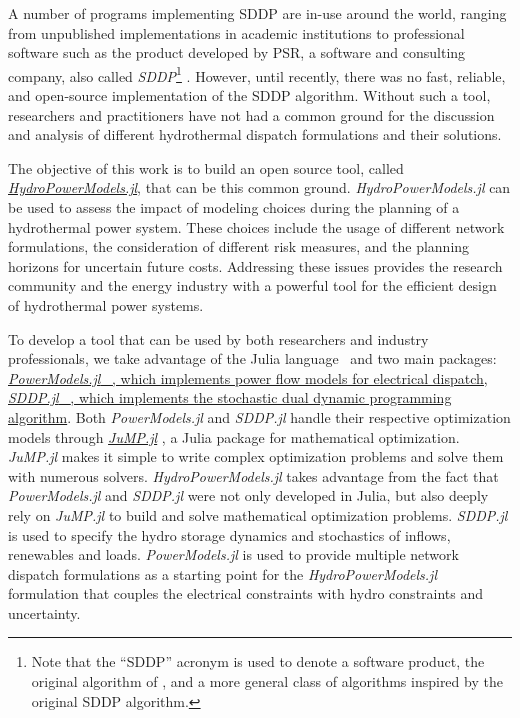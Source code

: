 \documentclass{juliacon}
\begin{document}
A number of programs implementing SDDP are in-use around the world, ranging from unpublished implementations in academic institutions to professional software such as the product developed by PSR, a software and consulting company, also called \textit{SDDP}\footnote{Note that the ``SDDP'' acronym is used to denote a software product, the original algorithm of \cite{pereira1991multi}, and a more general class of algorithms inspired by the original SDDP algorithm.} \cite{psr_software_2019}. However, until recently, there was no fast, reliable, and open-source implementation of the SDDP algorithm. Without such a tool, researchers and practitioners have not had a common ground for the discussion and analysis of different hydrothermal dispatch formulations and their solutions.

The objective of this work is to build an open source tool, called \href{https://github.com/andrewrosemberg/HydroPowerModels.jl}{\textit{HydroPowerModels.jl}}, that can be this common ground. \textit{HydroPowerModels.jl} can be used to assess the impact of modeling choices during the planning of a hydrothermal power system. These choices include the usage of different network formulations, the consideration of different risk measures, and the planning horizons for uncertain future costs. Addressing these issues provides the research community and the energy industry with a powerful tool for the efficient design of hydrothermal power systems.

To develop a tool that can be used by both researchers and industry professionals, we take advantage of the Julia language~\cite{bezanson2017julia} and two main packages: \href{https://github.com/lanl-ansi/PowerModels.jl}{\textit{PowerModels.jl} ~\cite{8442948}, which implements power flow models for electrical dispatch, \href{https://github.com/odow/SDDP.jl}{\textit{SDDP.jl}} ~\cite{dowson_sddp.jl}, which implements the stochastic dual dynamic programming algorithm}. Both \textit{PowerModels.jl} and \textit{SDDP.jl} handle their respective optimization models through \href{https://github.com/JuliaOpt/JuMP.jl}{\textit{JuMP.jl}} \cite{DunningHuchetteLubin2017}, a Julia package for mathematical optimization. \textit{JuMP.jl} makes it simple to write complex optimization problems and solve them with numerous solvers. \textit{HydroPowerModels.jl} takes advantage from the fact that \textit{PowerModels.jl} and \textit{SDDP.jl} were not only developed in Julia, but also deeply rely on \textit{JuMP.jl} to build and solve mathematical optimization problems. \textit{SDDP.jl} is used to specify the hydro storage dynamics and stochastics of inflows, renewables and loads. \textit{PowerModels.jl} is used to provide multiple network dispatch formulations as a starting point for the \textit{HydroPowerModels.jl} formulation that couples the electrical constraints with hydro constraints and uncertainty.
\end{document}
